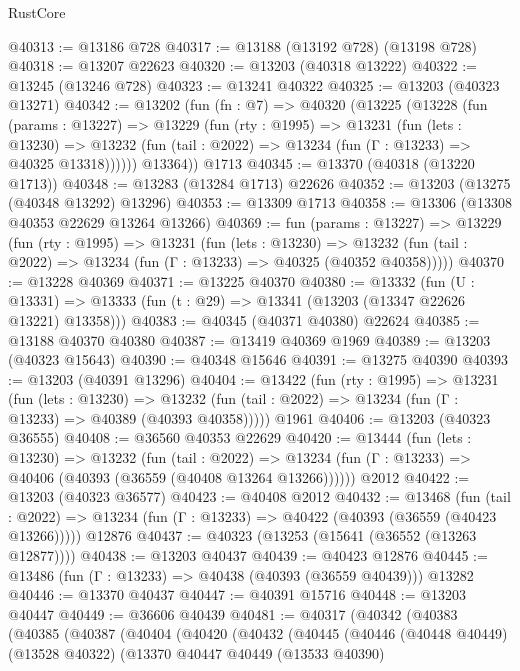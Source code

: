 \begin{lexlean}{RustCore}
\begin{coremodule}
@40313 := @13186 @728
@40317 := @13188 (@13192 @728) (@13198 @728)
@40318 := @13207 @22623
@40320 := @13203 (@40318 @13222)
@40322 := @13245 (@13246 @728)
@40323 := @13241 @40322
@40325 := @13203 (@40323 @13271)
@40342 := @13202
    (fun (fn : @7) =>
    @40320
      (@13225
        (@13228
          (fun (params : @13227) =>
          @13229
            (fun (rty : @1995) =>
            @13231
              (fun (lets : @13230) =>
              @13232 (fun (tail : @2022) => @13234 (fun (Γ : @13233) => @40325 @13318))))))
        @13364))
    @1713
@40345 := @13370 (@40318 (@13220 @1713))
@40348 := @13283 (@13284 @1713) @22626
@40352 := @13203 (@13275 (@40348 @13292) @13296)
@40353 := @13309 @1713
@40358 := @13306 (@13308 @40353 @22629 @13264 @13266)
@40369 := fun (params : @13227) =>
  @13229
    (fun (rty : @1995) =>
    @13231
      (fun (lets : @13230) =>
      @13232 (fun (tail : @2022) => @13234 (fun (Γ : @13233) => @40325 (@40352 @40358)))))
@40370 := @13228 @40369
@40371 := @13225 @40370
@40380 := @13332
    (fun (U : @13331) => @13333 (fun (t : @29) => @13341 (@13203 (@13347 @22626 @13221) @13358)))
@40383 := @40345 (@40371 @40380) @22624
@40385 := @13188 @40370 @40380
@40387 := @13419 @40369 @1969
@40389 := @13203 (@40323 @15643)
@40390 := @40348 @15646
@40391 := @13275 @40390
@40393 := @13203 (@40391 @13296)
@40404 := @13422
    (fun (rty : @1995) =>
    @13231
      (fun (lets : @13230) =>
      @13232 (fun (tail : @2022) => @13234 (fun (Γ : @13233) => @40389 (@40393 @40358)))))
    @1961
@40406 := @13203 (@40323 @36555)
@40408 := @36560 @40353 @22629
@40420 := @13444
    (fun (lets : @13230) =>
    @13232
      (fun (tail : @2022) =>
      @13234 (fun (Γ : @13233) => @40406 (@40393 (@36559 (@40408 @13264 @13266))))))
    @2012
@40422 := @13203 (@40323 @36577)
@40423 := @40408 @2012
@40432 := @13468
    (fun (tail : @2022) => @13234 (fun (Γ : @13233) => @40422 (@40393 (@36559 (@40423 @13266)))))
    @12876
@40437 := @40323 (@13253 (@15641 (@36552 (@13263 @12877))))
@40438 := @13203 @40437
@40439 := @40423 @12876
@40445 := @13486 (fun (Γ : @13233) => @40438 (@40393 (@36559 @40439))) @13282
@40446 := @13370 @40437
@40447 := @40391 @15716
@40448 := @13203 @40447
@40449 := @36606 @40439
@40481 := @40317
    (@40342
      (@40383
        (@40385
          (@40387
            (@40404
              (@40420
                (@40432
                  (@40445
                    (@40446
                      (@40448 @40449)
                      (@13528 @40322)
                      (@13370
                        @40447
                        @40449
                        (@13533 @40390)

\end{coremodule}
\end{lexlean}
